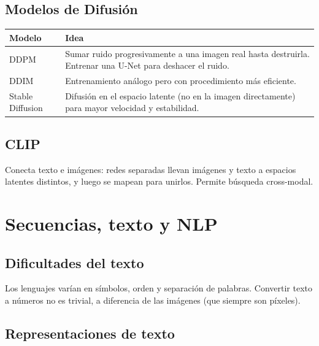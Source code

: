 \documentclass[12pt, a4paper]{article}
\begin{document}
\subsection{Modelos de Difusión}

\begin{center}
	\begin{tabular}{lp{9cm}}
		\toprule
		\textbf{Modelo}  & \textbf{Idea}                                                                                              \\
		\midrule
		DDPM             & Sumar ruido progresivamente a una imagen real hasta destruirla. Entrenar una U-Net para deshacer el ruido. \\
		DDIM             & Entrenamiento análogo pero con procedimiento más eficiente.                                                \\
		Stable Diffusion & Difusión en el espacio latente (no en la imagen directamente) para mayor velocidad y estabilidad.          \\
		\bottomrule
	\end{tabular}
\end{center}

\subsection{CLIP}

Conecta texto e imágenes: redes separadas llevan imágenes y texto a espacios latentes distintos, y luego se mapean para unirlos. Permite búsqueda cross-modal.

\section{Secuencias, texto y NLP}

\subsection{Dificultades del texto}

Los lenguajes varían en símbolos, orden y separación de palabras. Convertir texto a números no es trivial, a diferencia de las imágenes (que siempre son píxeles).

\subsection{Representaciones de texto}
\end{document}
